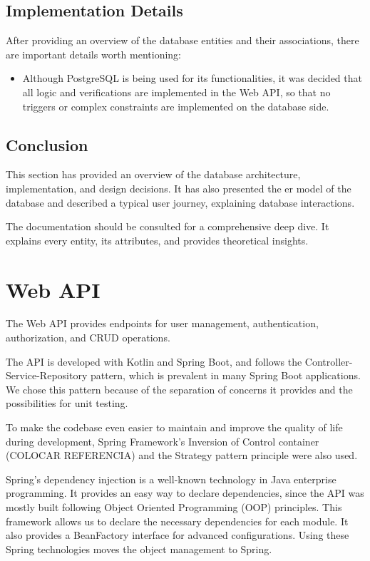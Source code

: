 \subsection{Implementation Details}
After providing an overview of the database entities and their associations, there are important details worth mentioning:

\begin{itemize}
    \item Although PostgreSQL is being used for its functionalities, it was decided that all logic and verifications are implemented in the Web API, so that no triggers or complex constraints are implemented on the database side.
\end{itemize}

\subsection{Conclusion}
This section has provided an overview of the database architecture, implementation, and design decisions. It has also presented the \acs{er model} of the database and described a typical user journey, explaining database interactions.

The documentation should be consulted for a comprehensive deep dive. It explains every entity, its attributes, and provides theoretical insights.

\section{Web API}
The Web API provides endpoints for user management, authentication, authorization, and CRUD operations. 

The API is developed with Kotlin and Spring Boot, and follows the Controller-Service-Repository pattern, which is prevalent in many Spring Boot applications. We chose this pattern because of the separation of concerns it provides and the possibilities for unit testing.

To make the codebase even easier to maintain and improve the quality of life during development, Spring Framework's Inversion of Control container (COLOCAR REFERENCIA) and the Strategy pattern principle were also used. 

Spring's dependency injection is a well-known technology in Java enterprise programming. It provides an easy way to declare dependencies, since the API was mostly built following Object Oriented Programming (OOP) principles. This framework allows us to declare the necessary dependencies for each module. It also provides a BeanFactory interface for advanced configurations. Using these Spring technologies moves the object management to Spring.

